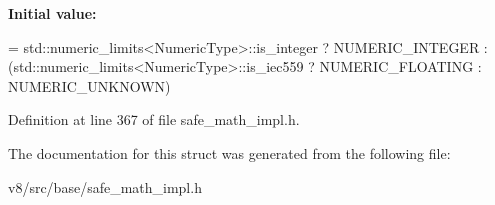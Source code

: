 {\bfseries Initial value\+:}
\begin{DoxyCode}
=
      std::numeric\_limits<NumericType>::is\_integer
          ? NUMERIC\_INTEGER
          : (std::numeric\_limits<NumericType>::is\_iec559 ? NUMERIC\_FLOATING
                                                         : NUMERIC\_UNKNOWN)
\end{DoxyCode}


Definition at line 367 of file safe\+\_\+math\+\_\+impl.\+h.



The documentation for this struct was generated from the following file\+:\begin{DoxyCompactItemize}
\item 
v8/src/base/safe\+\_\+math\+\_\+impl.\+h\end{DoxyCompactItemize}
